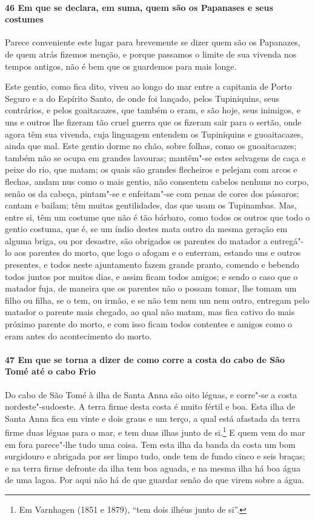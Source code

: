 \begin{linenumbers}
\paragraph{46 Em que se declara, em suma, quem são os Papanases e seus costumes} \quad
Parece conveniente este lugar para brevemente se dizer quem são os Papanazes, de quem
atrás fizemos menção, e porque passamos o limite de sua vivenda nos tempos antigos, não é
bem que os guardemos para mais longe.

Este gentio, como fica dito, viveu ao longo do mar entre a capitania de Porto Seguro e a
do Espírito Santo, de onde foi lançado, pelos Tupiniquins, seus contrários, e pelos
goaitacazes, que também o eram, e são hoje, seus inimigos, e uns e outros lhe fizeram tão
cruel guerra que os fizeram sair para o sertão, onde agora têm sua vivenda, cuja linguagem
entendem os Tupiniquins e guoaitacazes, ainda que mal. Este gentio dorme no chão, sobre
folhas, como os guoaitacazes; também não se ocupa em grandes lavouras; mantêm"-se estes
selvagens de caça e peixe do rio, que matam; os quais são grandes flecheiros e pelejam com
arcos e flechas, andam nus como o mais gentio, não consentem cabelos nenhuns no corpo,
senão os da cabeça, pintam"-se e enfeitam"-se com penas de cores dos pássaros; cantam e
bailam; têm muitas gentilidades, das que usam os Tupinambas. Mas, entre si, têm um costume
que não é tão bárbaro, como todos os outros que todo o gentio costuma, que é, se um índio
destes mata outro da mesma geração em alguma briga, ou por desastre, são obrigados os
parentes do matador a entregá"-lo aos parentes do morto, que logo o afogam e o enterram,
estando uns e outros presentes, e todos neste ajuntamento fazem grande pranto, comendo e
bebendo todos juntos por muitos dias, e assim ficam todos amigos; e sendo o caso que o
matador fuja, de maneira que os parentes não o possam tomar, lhe tomam um filho ou filha,
se o tem, ou irmão, e se não tem nem um nem outro, entregam pelo matador o parente mais
chegado, ao qual não matam, mas fica cativo do mais próximo parente do morto, e com isso
ficam todos contentes e amigos como o eram antes do acontecimento do morto.

\paragraph{47 Em que se torna a dizer de como corre a costa do cabo de São Tomé até o cabo
Frio} \quad
Do cabo de São Tomé à ilha de Santa Anna são oito léguas, e corre"-se a costa
nordeste"-sudoeste. A terra firme desta costa é muito fértil e boa. Esta ilha de Santa Anna
fica em vinte e dois graus e um terço, a qual está afastada da terra firme duas léguas
para o mar, e tem duas ilhas junto de si.\footnote{ Em Varnhagen (1851 e 1879), ``tem dois
ilhéus junto de si''.} E quem vem do mar em fora parece"-lhe tudo uma coisa. Tem esta ilha
da banda da costa um bom surgidouro e abrigada por ser limpo tudo, onde tem de fundo cinco
e seis braças; e na terra firme defronte da ilha tem boa aguada, e na mesma ilha há boa
água de uma lagoa. Por aqui não há de que guardar senão do que virem sobre a água.


\end{linenumbers}
